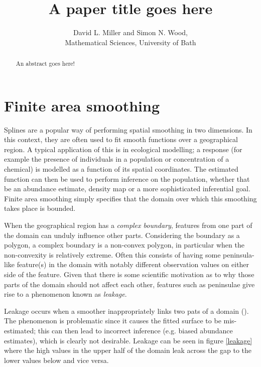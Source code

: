 \documentclass[10pt]{article}
\begin{document}
\title{A paper title goes here}

\author{David L. Miller and Simon N. Wood,
\\ Mathematical Sciences, University of Bath
}


\maketitle
\begin{abstract}
An abstract goes here!

\end{abstract}

\section{Finite area smoothing}

Splines are a popular way of performing spatial smoothing in two dimensions. In this context, they are often used to fit smooth functions over a geographical region. A typical application of this is in ecological modelling; a response (for example the presence of individuals in a population or concentration of a chemical) is modelled as a function of its spatial coordinates. The estimated function can then be used to perform inference on the population, whether that be an abundance estimate, density map or a more sophisticated inferential goal. Finite area smoothing simply specifies that the domain over which this smoothing takes place is bounded.

When the geographical region has a \emph{complex boundary}, features from one part of the domain can unduly influence other parts. Considering the boundary as a polygon, a complex boundary is a non-convex polygon, in particular when the non-convexity is relatively extreme. Often this consists of having some peninsula-like feature(s) in the domain with notably different observation values on either side of the feature. Given that there is some scientific motivation as to why those parts of the domain should not affect each other, features such as peninsulae give rise to a phenomenon known as \emph{leakage}.

Leakage occurs when a smoother inappropriately links two pats of a domain (\cite{soap}). The phenomenon is problematic since it causes the fitted surface to be mis-estimated; this can then lead to incorrect inference (e.g. biased abundance estimates), which is clearly not desirable. Leakage can be seen in figure \ref{leakage} where the high values in the upper half of the domain leak across the gap to the lower values below and vice versa.
\end{document}
